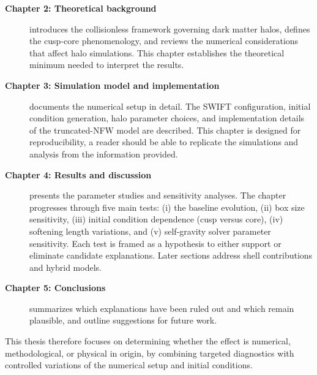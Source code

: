 \begin{description}

\item[\textbf{Chapter 2: Theoretical background}] introduces the collisionless framework governing dark matter halos, defines the cusp-core phenomenology, and reviews the numerical considerations that affect halo simulations. This chapter establishes the theoretical minimum needed to interpret the results.

\item[\textbf{Chapter 3: Simulation model and implementation}] documents the numerical setup in detail. The SWIFT configuration, initial condition generation, halo parameter choices, and implementation details of the truncated-NFW model are described. This chapter is designed for reproducibility, a reader should be able to replicate the simulations and analysis from the information provided.

\item[\textbf{Chapter 4: Results and discussion}] presents the parameter studies and sensitivity analyses. The chapter progresses through five main tests: (i) the baseline evolution, (ii) box size sensitivity, (iii) initial condition dependence (cusp versus core), (iv) softening length variations, and (v) self-gravity solver parameter sensitivity. Each test is framed as a hypothesis to either support or eliminate candidate explanations. Later sections address shell contributions and hybrid models.

\item[\textbf{Chapter 5: Conclusions}] summarizes which explanations have been ruled out and which remain plausible, and outline suggestions for future work.

\end{description}

This thesis therefore focuses on determining whether the effect is numerical, methodological, or physical in origin, by combining targeted diagnostics with controlled variations of the numerical setup and initial conditions.
